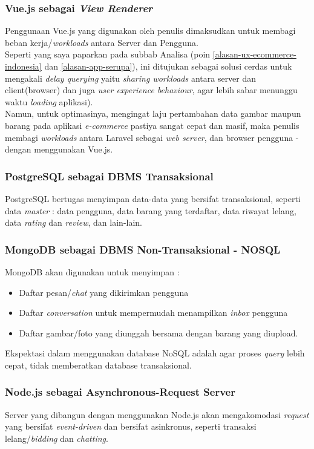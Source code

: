     \subsubsection{\textbf{Vue.js sebagai \textit{View Renderer} }}
	Penggunaan Vue.js yang digunakan oleh penulis dimaksudkan untuk membagi beban kerja/\textit{workloads} antara Server dan Pengguna. \\
    Seperti yang saya paparkan pada subbab Analisa (poin \ref{alasan-ux-ecommerce-indonesia} dan \ref{alasan-app-serupa}), ini ditujukan sebagai solusi cerdas untuk mengakali \textit{delay querying} yaitu \textit{sharing workloads} antara server dan client(browser) dan juga \textit{user experience behaviour}, agar lebih sabar menunggu waktu \textit{loading} aplikasi). \\
    Namun, untuk optimasinya, mengingat laju pertambahan data gambar maupun barang pada aplikasi \textit{e-commerce} pastiya sangat cepat dan masif, maka penulis membagi \textit{workloads} antara Laravel sebagai \textit{web server}, dan browser pengguna - dengan menggunakan Vue.js.
    
    
    \subsubsection{\textbf{PostgreSQL sebagai DBMS Transaksional}}
    PostgreSQL bertugas menyimpan data-data yang bersifat transaksional, seperti data \textit{master} : data pengguna, data barang yang terdaftar, data riwayat lelang, data \textit{rating} dan \textit{review}, dan lain-lain.    
    \subsubsection{\textbf{MongoDB} sebagai DBMS Non-Transaksional - NOSQL}
    MongoDB akan digunakan untuk menyimpan :
	    \begin{itemize}[noitemsep,topsep=0pt]
	    \item Daftar pesan/\textit{chat} yang dikirimkan pengguna
	    \item Daftar \textit{conversation} untuk mempermudah menampilkan \textit{inbox} pengguna
	    \item Daftar gambar/foto yang diunggah bersama dengan barang yang diupload.
	    \end{itemize}
	Ekspektasi dalam menggunakan database NoSQL adalah agar proses \textit{query} lebih cepat, tidak memberatkan database transaksional.

	\subsubsection{\textbf{Node.js} sebagai Asynchronous-Request Server}
    Server yang dibangun dengan menggunakan Node.js akan mengakomodasi \textit{request} yang bersifat \textit{event-driven} dan bersifat asinkronus, seperti transaksi lelang/\textit{bidding} dan \textit{chatting}.
    
